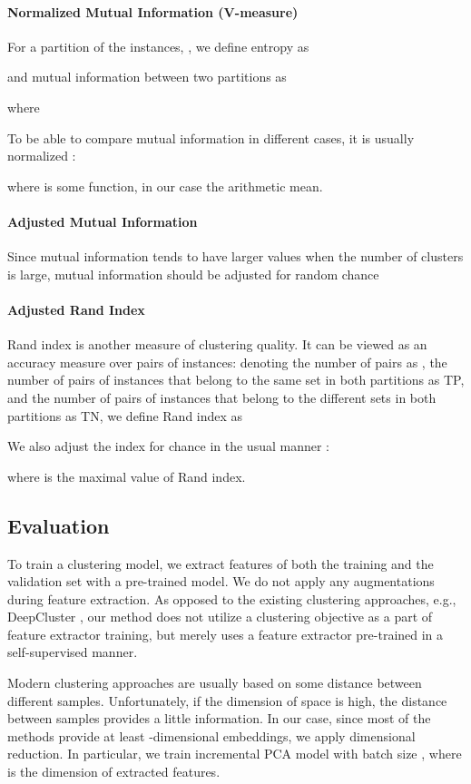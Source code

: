\documentclass[runningheads]{llncs}
\renewcommand{\cite}[1]{\citep{#1}}
\begin{document}
\paragraph{Normalized Mutual Information (V-measure)}
For a partition of the instances, , we define entropy as

and mutual information between two partitions as

where

To be able to compare mutual information in different cases, it is usually normalized \cite{kvalseth1987entropy}:

where  is some function, in our case the arithmetic mean.
\paragraph{Adjusted Mutual Information}
Since mutual information tends to have larger values when the number of clusters is large,  mutual information should be adjusted for random chance \cite{vinh2010information}

\paragraph{Adjusted Rand Index }
Rand index \cite{rand1971objective} is another measure of clustering quality. It can be viewed as an accuracy measure over pairs of instances: denoting the number of pairs as , the number of pairs of instances that belong to the same set in both partitions as TP, and the number of pairs of instances that belong to the different sets in both partitions as TN, we define Rand index as

We also adjust the index for chance in the usual manner \cite{hubert1985comparing}:

where  is the maximal value of Rand index. 

\subsection{Evaluation}
To train a clustering model, we extract features of both the training and the validation set with a pre-trained model. We do not apply any augmentations during feature extraction. As opposed to the existing clustering approaches, e.g., DeepCluster \cite{caron2018deepclustering}, our method does not utilize a clustering objective as a part of feature extractor training, but merely uses a feature extractor pre-trained in a self-supervised manner.

Modern clustering approaches are usually based on some distance between different samples. Unfortunately, if the dimension of space is high, the distance between samples provides a little information. In our case, since most of the methods provide at least -dimensional embeddings, we apply dimensional reduction. In particular, we train incremental PCA model with batch size , where  is the dimension of extracted features. 
\end{document}
